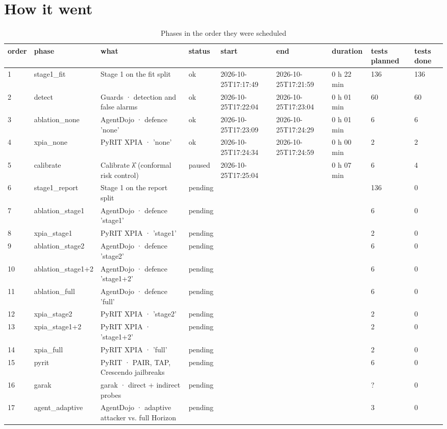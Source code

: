 \documentclass[11pt,a4paper]{article}
\begin{document}
\section*{How it went}
\begin{small}\begin{longtable}{lllllllll}
\caption{Phases in the order they were scheduled}\\
\toprule
order & phase & what & status & start & end & duration & tests planned & tests done \\
\midrule\endhead
1 & stage1\_fit & Stage 1 on the fit split & ok & 2026-10-25T17:17:49 & 2026-10-25T17:21:59 & 0 h 22 min & 136 & 136 \\
2 & detect & Guards · detection and false alarms & ok & 2026-10-25T17:22:04 & 2026-10-25T17:23:04 & 0 h 01 min & 60 & 60 \\
3 & ablation\_none & AgentDojo · defence 'none' & ok & 2026-10-25T17:23:09 & 2026-10-25T17:24:29 & 0 h 01 min & 6 & 6 \\
4 & xpia\_none & PyRIT XPIA · 'none' & ok & 2026-10-25T17:24:34 & 2026-10-25T17:24:59 & 0 h 00 min & 2 & 2 \\
5 & calibrate & Calibrate λ̂ (conformal risk control) & paused & 2026-10-25T17:25:04 &  & 0 h 07 min & 6 & 4 \\
6 & stage1\_report & Stage 1 on the report split & pending &  &  &  & 136 & 0 \\
7 & ablation\_stage1 & AgentDojo · defence 'stage1' & pending &  &  &  & 6 & 0 \\
8 & xpia\_stage1 & PyRIT XPIA · 'stage1' & pending &  &  &  & 2 & 0 \\
9 & ablation\_stage2 & AgentDojo · defence 'stage2' & pending &  &  &  & 6 & 0 \\
10 & ablation\_stage1+2 & AgentDojo · defence 'stage1+2' & pending &  &  &  & 6 & 0 \\
11 & ablation\_full & AgentDojo · defence 'full' & pending &  &  &  & 6 & 0 \\
12 & xpia\_stage2 & PyRIT XPIA · 'stage2' & pending &  &  &  & 2 & 0 \\
13 & xpia\_stage1+2 & PyRIT XPIA · 'stage1+2' & pending &  &  &  & 2 & 0 \\
14 & xpia\_full & PyRIT XPIA · 'full' & pending &  &  &  & 2 & 0 \\
15 & pyrit & PyRIT · PAIR, TAP, Crescendo jailbreaks & pending &  &  &  & 6 & 0 \\
16 & garak & garak · direct + indirect probes & pending &  &  &  & ? & 0 \\
17 & agent\_adaptive & AgentDojo · adaptive attacker vs. full Horizon & pending &  &  &  & 3 & 0 \\
\bottomrule
\end{longtable}\end{small}
\end{document}
